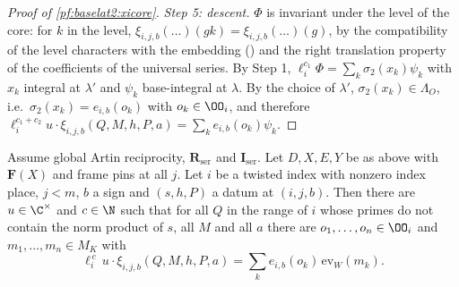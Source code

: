 \begin{proof}[Proof of \cref{pf:baselat2:xicore}]
\emph{Step 5: descent.} $\Phi$ is invariant under the level of the core: for $k$ in the level,
$\xi_{i,j,b}(\dots)(gk)=\xi_{i,j,b}(\dots)(g)$, by the compatibility of the level characters with the embedding
() and the right translation property of the
coefficients of the universal series. By Step 1, $\ell_i^{c_1}\Phi=\sum_k\sigma_2(x_k)\psi_k$ with $x_k$ integral at $\lambda'$
and $\psi_k$ base-integral at $\lambda$. By the choice of $\lambda'$, $\sigma_2(x_k)\in\Lambda_O$, i.e.\ $\sigma_2(x_k)=e_{i,b}(o_k)$ with
$o_k\in\OO_i$, and therefore $\ell_i^{c_1+c_2}u\cdot\xi_{i,j,b}(Q,M,h,P,a)=\sum_ke_{i,b}(o_k)\psi_k$.
\end{proof}

\begin{proposition}\label{pf:baselat2:xicomb}
Assume global Artin reciprocity, $\mathbf{R}_{\mathrm{ser}}$ and $\mathbf{I}_{\mathrm{ser}}$. Let $D,X,E,Y$ be as above with
$\mathbf{F}(X)$ and frame pins at all $j$. Let $i$ be a twisted index with nonzero index place, $j<m$, $b$ a sign and
$(s,h,P)$ a datum at $(i,j,b)$. Then there are $u\in\C^\times$ and $c\in\N$ such that for all $Q$ in the range of $i$
whose primes do not contain the norm product of $s$, all $M$ and all $a$ there are $o_1,\dots,o_n\in\OO_i$ and
$m_1,\dots,m_n\in M_K$ with
\begin{equation}\label{eq:pf:baselat2:xicomb}
  \ell_i^{\,c}\,u\cdot\xi_{i,j,b}(Q,M,h,P,a)=\sum_k e_{i,b}(o_k)\,\mathrm{ev}_W(m_k).
\end{equation}
\end{proposition}


